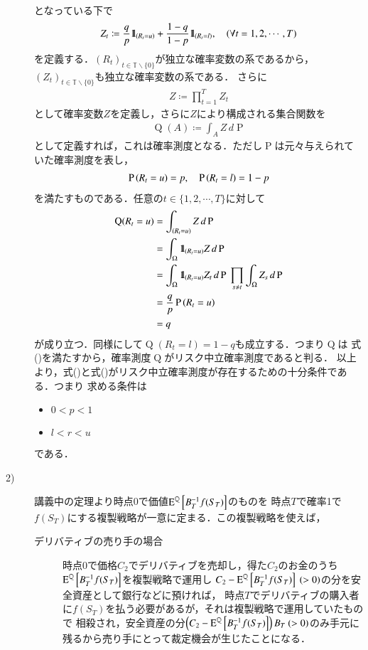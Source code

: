 \begin{description}
\begin{align}
	\end{align}
	となっている下で
	\begin{align}
		Z_t \coloneqq \frac{q}{p}\defunc_{(R_t = u)}+ \frac{1-q}{1-p}\defunc_{(R_t = l)}, 
		\quad (\forall t = 1,2,\cdots,T) 
	\end{align}
	を定義する．$(R_t)_{t \in \mathbb{T}\backslash \{0\}}$が独立な確率変数の系であるから，
	$(Z_t)_{t \in \mathbb{T}\backslash \{0\}}$も独立な確率変数の系である．
	さらに
	\begin{align}
		Z \coloneqq \prod_{t = 1}^{T} Z_t
	\end{align}
	として確率変数$Z$を定義し，さらに$Z$により構成される集合関数を
	\begin{align}
		\operatorname{Q}(A) \coloneqq \int_{A} Z\, d\operatorname{P}
	\end{align}
	として定義すれば，これは確率測度となる．ただし$\operatorname{P}$は元々与えられていた確率測度を表し，
	\begin{align}
		\prob{R_t = u} = p, \quad \prob{R_t = l} = 1-p
	\end{align}
	を満たすものである．任意の$t \in \{1,2,\cdots,T\}$に対して
	\begin{align}
		\operatorname{Q}(R_t = u) &= \int_{(R_t=u)} Z\, d\operatorname{P} \\
		&= \int_{\Omega} \defunc_{(R_t = u)} Z\, d\operatorname{P} \\
		&= \int_{\Omega} \defunc_{(R_t = u)} Z_t\, d\operatorname{P}\ \prod_{s \neq t} \int_{\Omega} Z_s\, d\operatorname{P} \\
		&= \frac{q}{p}\prob{R_t = u} \\
		&= q
	\end{align}
	が成り立つ．同様にして$\operatorname{Q}(R_t = l) = 1-q$も成立する．つまり$\operatorname{Q}$は
	式()を満たすから，確率測度$\operatorname{Q}$がリスク中立確率測度であると判る．
	以上より，式()と式()がリスク中立確率測度が存在するための十分条件である．つまり
	求める条件は
	\begin{itemize}
		\item $0 < p < 1$
		\item $l < r < u$
	\end{itemize}
	である．

\item[2)] 講義中の定理より時点$0$で価値$\Exp{B_T^{-1}f(S_T)}{}{\mathbb{Q}}$のものを
	時点$T$で確率1で$f(S_T)$にする複製戦略が一意に定まる．この複製戦略を使えば，
	\begin{description}
		\item[デリバティブの売り手の場合] 
			時点$0$で価格$C_2$でデリバティブを売却し，得た$C_2$のお金のうち$\Exp{B_T^{-1}f(S_T)}{}{\mathbb{Q}}$を複製戦略で運用し
			$C_2 - \Exp{B_T^{-1}f(S_T)}{}{\mathbb{Q}}\ (> 0)$の分を安全資産として銀行などに預ければ，
			時点$T$でデリバティブの購入者に$f(S_T)$を払う必要があるが，それは複製戦略で運用していたもので
			相殺され，安全資産の分$\left(C_2 - \Exp{B_T^{-1}f(S_T)}{}{\mathbb{Q}}\right)B_T\ (> 0)$のみ手元に残るから売り手にとって裁定機会が生じたことになる．
			

\end{description}
\end{description}
